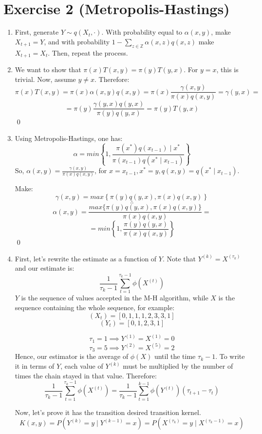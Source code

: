\documentclass[12pt,letterpaper]{article}
\begin{document}
\section*{Exercise 2 (Metropolis-Hastings)}
\begin{enumerate}[leftmargin=!,labelindent=5pt]
\item First, generate $Y \sim q(X_t, \cdot)$. 
With probability equal to $\alpha(x,y)$, make $X_{t+1} = Y$, and with
probability $1 - \sum_{z \in \mathbb Z} \alpha(x,z)q(x,z)$ make
$X_{t+1} = X_t$. Then, repeat the process.

\item We want to show that $\pi(x)T(x,y) = \pi(y)T(y,x)$.
For $y=x$, this is trivial. Now, assume $y\neq x$. Therefore:
$$
\pi(x)T(x,y) = \pi(x)\alpha(x,y)q(x,y) =
\pi(x)\frac{\gamma(x,y)}{\pi(x)q(x,y)} = \gamma(y,x) =
$$
$$
= 
\pi(y)\frac{\gamma(y,x)q(y,x)}{\pi(y)q(y,x)} = \pi(y)T(y,x)
$$
\qed


\item Using Metropolis-Hastings, one has:
$$ \alpha = min \left\{ 
1, \frac{\pi(x^*)q(x_{t-1}) \mid x^*}{\pi(x_{t-1})q(x^*\mid x_{t-1})}
\right\}$$
So, $\alpha(x,y) = \frac{\gamma(x,y)}{\pi(x)q(x,y)}$, for
$x = x_{t-1}, x^* = y, q(x,y) = q(x^* \mid x_{t-1})$.

Make:
$$ \gamma(x,y) = max \left\{ 
\pi(y)q(y,x),\pi(x)q(x,y)
\right\}$$
$$ \therefore $$
$$\alpha(x,y) =
\frac{max\{ \pi(y)q(y,x), \pi(x)q(x,y)\}}{\pi(x)q(x,y)} = 
$$
$$ = min \left\{ 
1, \frac{\pi(y)q(y,x)}{\pi(x)q(x,y)}
\right\}$$
\qed

\item First, let's rewrite the estimate as a function of $Y$.
Note that $Y^{(k)} = X^{(\tau_k)}$ and our estimate is:
$$
\frac{1}{\tau_k - 1} \sum_{t=1}^{\tau_k-1} \phi(X^{(t)})
$$
$Y$ is the sequence of values accepted in the M-H algorithm, while
$X$ is the sequence containing the whole sequence, for example:
$$
(X_t) = [0,1,1,1,2,3,3,1]
$$
$$
(Y_t) = [0,1,2,3,1]
$$

$$
\tau_1 = 1 \implies Y^{(1)} = X^{(1)} = 0
$$
$$
\tau_3 = 5 \implies Y^{(2)} = X^{(5)} = 2
$$
Hence, our estimator is the average of
$\phi(X)$ until the time $\tau_k - 1$. To write it in terms of $Y$,
each value of $Y^{(k)}$ must be multiplied by the number of times
the chain stayed in that value. Therefore:
$$
\frac{1}{\tau_k - 1} \sum_{t=1}^{\tau_k-1} \phi(X^{(t)}) =
\frac{1}{\tau_k - 1} \sum_{t=1}^{k-1} \phi(Y^{(t)})
(\tau_{t+1} - \tau_{t})
$$


Now, let's prove it has the transition desired transition kernel.
$$
K(x,y) = P(Y^{(k)}= y \mid Y^{(k-1)}=x) =
P(X^{(\tau_k)}=y \mid X^{(\tau_k -1)}=x)
$$


\end{enumerate}
\end{document}
